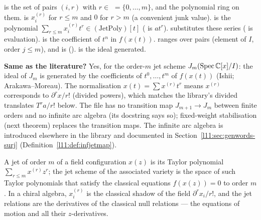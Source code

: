 \begin{dictionary}
 is the set of pairs $(i,r)$ with $r\in$  $=\{0,\dots,m\}$, and 
the polynomial ring on them.  is $x_i^{(r)}$ for $r\le m$ and $0$ for $r>m$ (a convenient
junk value).  is the polynomial $\sum_{r\le m}x_i^{(r)}t^r\in(\text{JetPoly})[t]$
(\allowbreak{} is $at^r$).  substitutes these series (
is evaluation).  is the coefficient of $t^n$ in $f(x(t))$.  ranges over
pairs (element of $I$, order $j\le m$), and  is 
().  is the ideal generated.

\textbf{Same as the literature?} Yes, for the order-$m$ jet scheme $J_m(\operatorname{Spec}{\mathbb{C}}[x]/I)$: the ideal of
$J_m$ is generated by the coefficients of $t^0,\dots,t^m$ of $f(x(t))$ (Ishii; Arakawa--Moreau). The normalisation
$x(t) = \sum x^{(r)}t^r$ means $x^{(r)}$ corresponds to $\partial^rx/r!$ (divided powers), which matches the library's
divided translates $T^r a/r!$ below. The file  has no transition map $J_{m+1}\to J_m$ between finite orders and no
infinite arc algebra (its docstring says so); fixed-weight stabilisation (next theorem) replaces the transition maps. The
infinite arc algebra  is introduced elsewhere in the library and documented in
Section~\ref{l11:sec:genwords-surj} (Definition~\ref{l11:def:infjetmap}).
\end{dictionary}

\begin{physics}
A jet of order $m$ of a field configuration $x(z)$ is its Taylor polynomial $\sum_{r\le m}x^{(r)}z^r$; the jet
scheme of the associated variety is the space of such Taylor polynomials that satisfy the classical equations
$f(x(z)) = 0$ to order $m$. In a chiral algebra, $x_i^{(r)}$ is the classical shadow of the field
$\partial^rx_i/r!$, and the jet relations are the derivatives of the classical null relations --- the equations of
motion and all their $z$-derivatives.
\end{physics}

